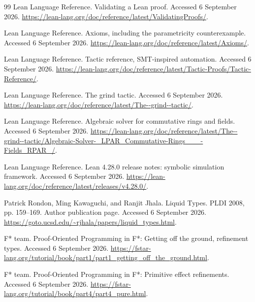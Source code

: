 \documentclass[11pt,a4paper]{article}
\theoremstyle{plain}
\theoremstyle{definition}
\begin{document}
\begin{thebibliography}{99}
 Lean Language Reference. Validating a Lean proof. Accessed 6 September 2026. \url{https://lean-lang.org/doc/reference/latest/ValidatingProofs/}.

 Lean Language Reference. Axioms, including the parametricity counterexample. Accessed 6 September 2026. \url{https://lean-lang.org/doc/reference/latest/Axioms/}.

 Lean Language Reference. Tactic reference, SMT-inspired automation. Accessed 6 September 2026. \url{https://lean-lang.org/doc/reference/latest/Tactic-Proofs/Tactic-Reference/}.

 Lean Language Reference. The grind tactic. Accessed 6 September 2026. \url{https://lean-lang.org/doc/reference/latest/The--grind--tactic/}.

 Lean Language Reference. Algebraic solver for commutative rings and fields. Accessed 6 September 2026. \url{https://lean-lang.org/doc/reference/latest/The--grind--tactic/Algebraic-Solver-_LPAR_Commutative-Rings___-Fields_RPAR_/}.

 Lean Language Reference. Lean 4.28.0 release notes: symbolic simulation framework. Accessed 6 September 2026. \url{https://lean-lang.org/doc/reference/latest/releases/v4.28.0/}.

 Patrick Rondon, Ming Kawaguchi, and Ranjit Jhala. Liquid Types. PLDI 2008, pp. 159--169. Author publication page. Accessed 6 September 2026. \url{https://goto.ucsd.edu/~rjhala/papers/liquid_types.html}.

 F* team. Proof-Oriented Programming in F*: Getting off the ground, refinement types. Accessed 6 September 2026. \url{https://fstar-lang.org/tutorial/book/part1/part1_getting_off_the_ground.html}.

 F* team. Proof-Oriented Programming in F*: Primitive effect refinements. Accessed 6 September 2026. \url{https://fstar-lang.org/tutorial/book/part4/part4_pure.html}.

\end{thebibliography}
\end{document}
